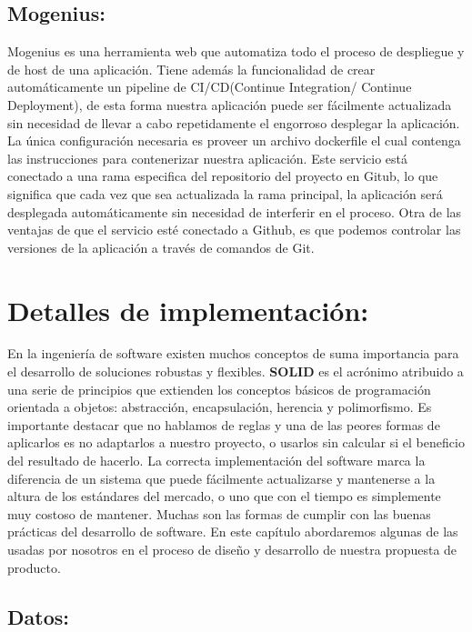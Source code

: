 \subsection{Mogenius:}

Mogenius es una herramienta web que automatiza todo el proceso de despliegue y de host de una aplicación. Tiene además la funcionalidad de crear automáticamente un pipeline de CI/CD(Continue Integration/ Continue Deployment), de esta forma nuestra aplicación puede ser fácilmente actualizada sin necesidad de llevar a cabo repetidamente el engorroso desplegar la aplicación. La única configuración necesaria es proveer un archivo dockerfile el cual contenga las instrucciones para contenerizar nuestra aplicación. Este servicio está conectado a una rama especifica del repositorio del proyecto en Gitub, lo que significa que cada vez que sea actualizada la rama principal, la aplicación será desplegada automáticamente sin necesidad de interferir en el proceso. Otra de las ventajas de que el servicio esté conectado a Github, es que podemos controlar las versiones de la aplicación a través de comandos de Git.


\section{Detalles de implementación:}

En la ingeniería de software existen muchos conceptos de suma importancia para el desarrollo de soluciones robustas y flexibles. \textbf{SOLID} es el acrónimo atribuido a una serie de principios que extienden los conceptos básicos de programación orientada a objetos: abstracción, encapsulación, herencia y polimorfismo. Es importante destacar que no hablamos de reglas y una de las peores formas de aplicarlos es no adaptarlos a nuestro proyecto, o usarlos sin calcular si el beneficio del resultado de hacerlo. La correcta implementación del software marca la diferencia de un sistema que puede fácilmente actualizarse y mantenerse a la altura de los estándares del mercado, o uno que con el tiempo es simplemente muy costoso de mantener. Muchas son las formas de cumplir con las buenas prácticas del desarrollo de software. En este capítulo abordaremos algunas de las usadas por nosotros en el proceso de diseño y desarrollo de nuestra propuesta de producto.

\subsection{Datos:}

